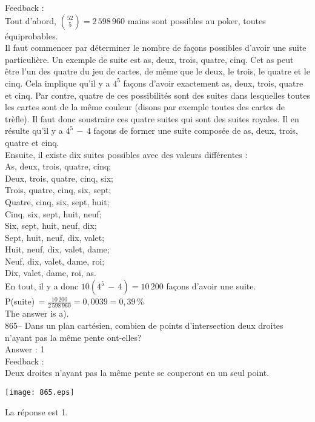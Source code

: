 ﻿\documentclass[letterpaper, 12pt]{article}
\begin{document}
Feedback : \\
Tout d'abord, $\binom{52}{5}=2\,598\,960$ mains sont possibles au poker,
toutes \'equiprobables.  \\
Il faut commencer par d\'eterminer le nombre de fa\c cons possibles d'avoir
une suite particuli\`ere.  Un exemple de suite est as, deux, trois, quatre,
cinq.  Cet as peut \^etre l'un des quatre du jeu de cartes, de m\^eme que le
deux, le trois, le quatre et le cinq.  Cela implique qu'il y a $4^{5}$ fa\c
cons d'avoir exactement as, deux, trois, quatre et cinq.  Par contre, quatre
de ces possibilit\'es sont des suites dans lesquelles toutes les cartes sont
de la m\^eme couleur (disons par exemple toutes des cartes de tr\`efle).  Il
faut donc soustraire ces quatre suites qui sont des suites royales.  Il en
r\'esulte qu'il y a $4^{5}\,-\,4$ fa\c cons de former une suite compos\'ee
de as, deux, trois, quatre et cinq.  \\
Ensuite, il existe dix suites possibles avec des valeurs diff\'erentes :\\
As, deux, trois, quatre, cinq;\\
Deux, trois, quatre, cinq, six;\\
Trois, quatre, cinq, six, sept;\\
Quatre, cinq, six, sept, huit;\\
Cinq, six, sept, huit, neuf;\\
Six, sept, huit, neuf, dix;\\
Sept, huit, neuf, dix, valet;\\
Huit, neuf, dix, valet, dame;\\
Neuf, dix, valet, dame, roi;\\
Dix, valet, dame, roi, as.\\

En tout, il y a donc $10(4^{5}\,-\,4)=10\,200$ fa\c cons d'avoir une suite.
\\[2mm]
P(suite)$\,=\frac{10\,200}{2\,598\,960}=0,0039=0,39\,\%$\\[2mm]
The answer is a).\\

865-- Dans un plan cart\'esien, combien de points d'intersection deux
droites n'ayant pas la m\^eme pente ont-elles?\\

Answer : 1\\

Feedback : \\
Deux droites n'ayant pas la m\^eme pente se couperont en un seul
point.   \begin{center}
    \texttt{[image: 865.eps]}
    \end{center}  La
r\'eponse est 1.\\
\end{document}
